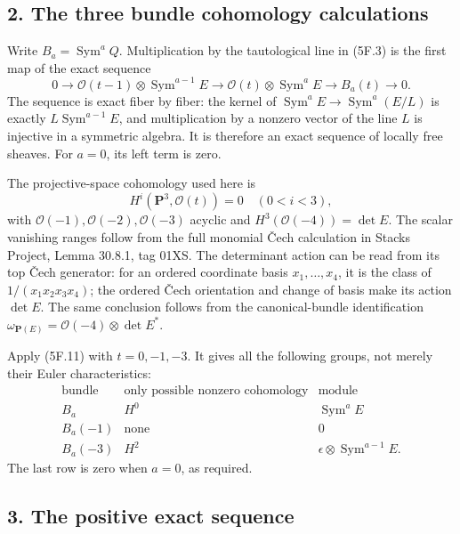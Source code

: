 \documentclass[
  10pt,
]{article}
\begin{document}
\subsection{2. The three bundle cohomology
calculations}\label{the-three-bundle-cohomology-calculations}

Write \(B_a=\operatorname{Sym}^aQ\). Multiplication by the tautological
line in (5F.3) is the first map of the exact sequence \[
0\longrightarrow\mathcal O(t-1)\otimes\operatorname{Sym}^{a-1}E
\longrightarrow\mathcal O(t)\otimes\operatorname{Sym}^{a}E
\longrightarrow B_a(t)\longrightarrow0.
\tag{5F.11}
\] The sequence is exact fiber by fiber: the kernel of
\(\operatorname{Sym}^aE\to\operatorname{Sym}^a(E/L)\) is exactly
\(L\operatorname{Sym}^{a-1}E\), and multiplication by a nonzero vector
of the line \(L\) is injective in a symmetric algebra. It is therefore
an exact sequence of locally free sheaves. For \(a=0\), its left term is
zero.

The projective-space cohomology used here is \[
H^i(\mathbf P^3,\mathcal O(t))=0\quad(0<i<3),
\] with \(\mathcal O(-1),\mathcal O(-2),\mathcal O(-3)\) acyclic and
\(H^3(\mathcal O(-4))=\det E\). The scalar vanishing ranges follow from
the full monomial Čech calculation in Stacks Project, Lemma 30.8.1, tag
01XS. The determinant action can be read from its top Čech generator:
for an ordered coordinate basis \(x_1,\ldots,x_4\), it is the class of
\(1/(x_1x_2x_3x_4)\); the ordered Čech orientation and change of basis
make its action \(\det E\). The same conclusion follows from the
canonical-bundle identification
\(\omega_{\mathbf P(E)}=\mathcal O(-4)\otimes\det E^*\).

Apply (5F.11) with \(t=0,-1,-3\). It gives all the following groups, not
merely their Euler characteristics: \[
\begin{array}{c|c|c}
\text{bundle}&\text{only possible nonzero cohomology}&\text{module}\\\hline
B_a&H^0&\operatorname{Sym}^aE\\
B_a(-1)&\text{none}&0\\
B_a(-3)&H^2&\epsilon\otimes\operatorname{Sym}^{a-1}E.
\end{array}
\tag{5F.12}
\] The last row is zero when \(a=0\), as required.

\subsection{3. The positive exact
sequence}\label{the-positive-exact-sequence}
\end{document}
